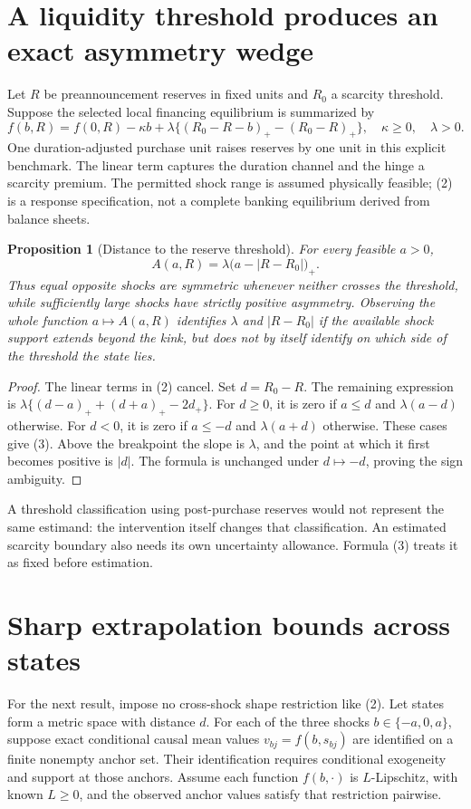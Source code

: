 \documentclass[11pt]{article}
\newtheorem{proposition}[theorem]{Proposition}
\theoremstyle{definition}
\begin{document}
\section*{A liquidity threshold produces an exact asymmetry wedge}
Let $R$ be preannouncement reserves in fixed units and $R_0$ a scarcity threshold. Suppose the selected local financing equilibrium is summarized by
\[
 f(b,R)=f(0,R)-\kappa b+\lambda\{(R_0-R-b)_+-(R_0-R)_+\},
 \quad\kappa\ge0,\quad\lambda>0.
 \tag{2}
\]
One duration-adjusted purchase unit raises reserves by one unit in this explicit benchmark. The linear term captures the duration channel and the hinge a scarcity premium. The permitted shock range is assumed physically feasible; (2) is a response specification, not a complete banking equilibrium derived from balance sheets.

\begin{proposition}[Distance to the reserve threshold]
For every feasible $a>0$,
\[
 A(a,R)=\lambda\bigl(a-|R-R_0|\bigr)_+.
 \tag{3}
\]
Thus equal opposite shocks are symmetric whenever neither crosses the threshold, while sufficiently large shocks have strictly positive asymmetry. Observing the whole function $a\mapsto A(a,R)$ identifies $\lambda$ and $|R-R_0|$ if the available shock support extends beyond the kink, but does not by itself identify on which side of the threshold the state lies.
\end{proposition}
\begin{proof}
The linear terms in (2) cancel. Set $d=R_0-R$. The remaining expression is $\lambda\{(d-a)_++(d+a)_+-2d_+\}$. For $d\ge0$, it is zero if $a\le d$ and $\lambda(a-d)$ otherwise. For $d<0$, it is zero if $a\le-d$ and $\lambda(a+d)$ otherwise. These cases give (3). Above the breakpoint the slope is $\lambda$, and the point at which it first becomes positive is $|d|$. The formula is unchanged under $d\mapsto-d$, proving the sign ambiguity.
\end{proof}
A threshold classification using post-purchase reserves would not represent the same estimand: the intervention itself changes that classification. An estimated scarcity boundary also needs its own uncertainty allowance. Formula (3) treats it as fixed before estimation.

\section*{Sharp extrapolation bounds across states}
For the next result, impose no cross-shock shape restriction like (2). Let states form a metric space with distance $d$. For each of the three shocks $b\in\{-a,0,a\}$, suppose exact conditional causal mean values $v_{bj}=f(b,s_{bj})$ are identified on a finite nonempty anchor set. Their identification requires conditional exogeneity and support at those anchors. Assume each function $f(b,\cdot)$ is $L$-Lipschitz, with known $L\ge0$, and the observed anchor values satisfy that restriction pairwise.
\end{document}
